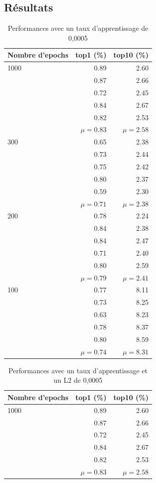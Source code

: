 \documentclass{article}
\begin{document}
\subsection{Résultats}

\begin{table}[htbp]
\centering
\begin{tabular}{lrr}  
\toprule
Nombre d'epochs  & top1 (\%) & top10 (\%) \\
\midrule
1000 & 0.89 & 2.60 \\
         & 0.87 & 2.66 \\
         & 0.72 & 2.45 \\
         & 0.84 & 2.67 \\
         & 0.82 & 2.53 \\
         & $\mu = 0.83$ &  $\mu = 2.58$ \\
300   & 0.65 & 2.38 \\
         & 0.73 & 2.44 \\
         & 0.75 & 2.42 \\
         & 0.80 & 2.37 \\
         & 0.59 & 2.30 \\
         & $\mu = 0.71$ &  $\mu = 2.38$ \\
200   & 0.78 & 2.24 \\
         & 0.84 & 2.38 \\
         & 0.84 & 2.47 \\
         & 0.71 & 2.40 \\
         & 0.80 & 2.59 \\
         & $\mu = 0.79$ &  $\mu = 2.41$ \\
100   & 0.77 & 8.11 \\
         & 0.73 & 8.25 \\
         & 0.63 & 8.23 \\
         & 0.78 & 8.37 \\
         & 0.80 & 8.59 \\
         & $\mu = 0.74$ &  $\mu = 8.31$ \\
\bottomrule
\end{tabular}
\caption{Performances avec un taux d'apprentissage de 0,0005}
\label{tab:booktabs}
\end{table}

\begin{table}[htbp]
\centering
\begin{tabular}{lrr}  
\toprule
Nombre d'epochs  & top1 (\%) & top10 (\%) \\
\midrule
1000 & 0.89 & 2.60 \\
         & 0.87 & 2.66 \\
         & 0.72 & 2.45 \\
         & 0.84 & 2.67 \\
         & 0.82 & 2.53 \\
         & $\mu = 0.83$ &  $\mu = 2.58$ \\
\bottomrule
\end{tabular}
\caption{Performances avec un taux d'apprentissage et un L2 de 0,0005}
\label{tab:booktabs}
\end{table}
\end{document}
